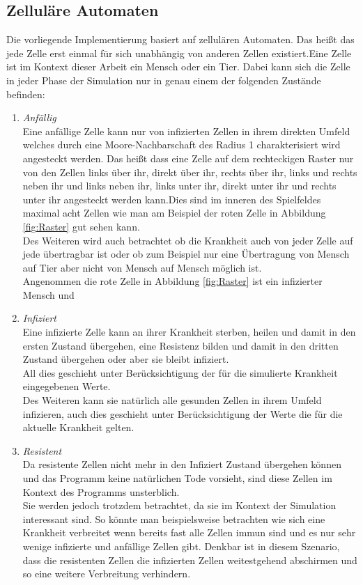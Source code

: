 \subsection*{Zelluläre Automaten}
Die vorliegende Implementierung basiert auf zellulären Automaten. Das heißt das jede Zelle erst einmal für sich unabhängig von anderen Zellen existiert.Eine Zelle ist im Kontext dieser Arbeit ein Mensch oder ein Tier. Dabei kann sich die Zelle in jeder Phase der Simulation nur in genau einem der folgenden Zustände befinden:
\begin{enumerate}
\item{\emph{Anfällig}\\
Eine anfällige Zelle kann nur von infizierten Zellen in ihrem direkten Umfeld welches durch eine Moore-Nachbarschaft \cite{Weisstein:2014} des Radius 1 charakterisiert wird angesteckt werden. Das heißt dass eine Zelle auf dem rechteckigen Raster nur von den Zellen links über ihr, direkt über ihr, rechts über ihr, links und rechts neben ihr und links neben ihr, links unter ihr, direkt unter ihr und rechts unter ihr angesteckt werden kann.Dies sind im inneren des Spielfeldes maximal acht Zellen wie man am Beispiel der roten Zelle in Abbildung \ref{fig:Raster} gut sehen kann.\\
Des Weiteren wird auch betrachtet ob die Krankheit auch von jeder Zelle auf jede übertragbar ist oder ob zum Beispiel nur eine Übertragung von Mensch auf Tier aber nicht von Mensch auf Mensch möglich ist.\\
Angenommen die rote Zelle in Abbildung \ref{fig:Raster} ist ein infizierter Mensch und 
}
\item{\emph{Infiziert}\\
Eine infizierte Zelle kann an ihrer Krankheit sterben, heilen und damit in den ersten Zustand übergehen, eine Resistenz bilden und damit in den dritten Zustand übergehen oder aber sie bleibt infiziert.\\
All dies geschieht unter Berücksichtigung der für die simulierte Krankheit eingegebenen Werte.\\
Des Weiteren kann sie natürlich alle gesunden Zellen in ihrem Umfeld infizieren, auch dies geschieht unter Berücksichtigung der Werte die für die aktuelle Krankheit gelten.
}
\item{\emph{Resistent}\\
Da resistente Zellen nicht mehr in den Infiziert Zustand übergehen können und das Programm keine natürlichen Tode vorsieht, sind diese Zellen im Kontext des Programms unsterblich.\\
Sie werden jedoch trotzdem betrachtet, da sie im Kontext der Simulation interessant sind. So könnte man beispielsweise betrachten wie sich eine Krankheit verbreitet wenn bereits fast alle Zellen immun sind und es nur sehr wenige infizierte und anfällige Zellen gibt. Denkbar ist in diesem Szenario, dass die resistenten Zellen die infizierten Zellen weitestgehend abschirmen und so eine weitere Verbreitung verhindern. 
}


\end{enumerate}
